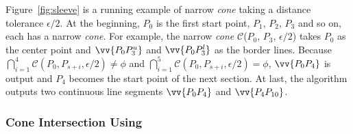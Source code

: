 \begin{example}
\label{exm-alg-sleeve}
Figure~\ref{fig:sleeve} is a running example of narrow \emph{cone} taking a distance tolerance $\epsilon/2$. At the beginning, $P_0$ is the first start point, $P_1$, $P_2$, $P_3$ and so on, each has a narrow \emph{cone}.
For example, the narrow \emph{cone} $\mathcal{C}$($P_0$, $P_{3}$, $\epsilon/2$) takes $P_0$ as the center point and $\vv{P_0P^u_{3}}$ and $\vv{P_0P^l_{3}}$ as the border lines.
Because $\bigcap_{i=1}^{4}\mathcal{C}(P_0, P_{s+i}, \epsilon/2) \ne \phi$ and $\bigcap_{i=1}^{5}\mathcal{C}(P_0, P_{s+i}, \epsilon/2) = \phi$, $\vv{P_0P_4}$ is output and $P_4$ becomes the start point of the next section.
At last, the algorithm outputs two continuous line segments $\vv{P_0P_4}$ and $\vv{P_4P_{10}}$.
\end{example}

\subsubsection {Cone Intersection Using \sed}
